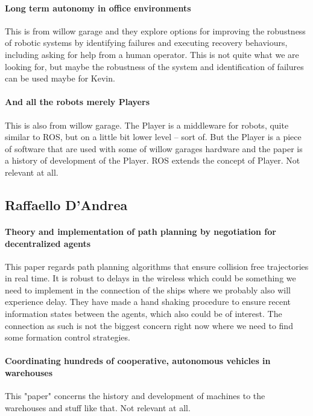 \paragraph{Long term autonomy in office environments}
This is from willow garage and they explore options for improving the robustness of robotic systems by identifying failures and executing recovery behaviours, including asking for help from a human operator.
This is not quite what we are looking for, but maybe the robustness of the system and identification of failures can be used maybe for Kevin.

\paragraph{And all the robots merely Players}
This is also from willow garage. The Player is a middleware for robots, quite similar to ROS, but on a little bit lower level -- sort of. But the Player is a piece of software that are used with some of willow garages hardware and the paper is a history of development of the Player. ROS extends the concept of Player. Not relevant at all.


\subsection{Raffaello D'Andrea}

\paragraph{Theory and implementation of path planning by negotiation for decentralized agents}
This paper regards path planning algorithms that ensure collision free trajectories in real time. It is robust to delays in the wireless which could be something we need to implement in the connection of the ships where we probably also will experience delay. They have made a hand shaking procedure to ensure recent information states between the agents, which also could be of interest.
The connection as such is not the biggest concern right now where we need to find some formation control strategies.

\paragraph{Coordinating hundreds of cooperative, autonomous vehicles in warehouses}
This "paper" concerns the history and development of machines to the warehouses and stuff like that.
Not relevant at all.

